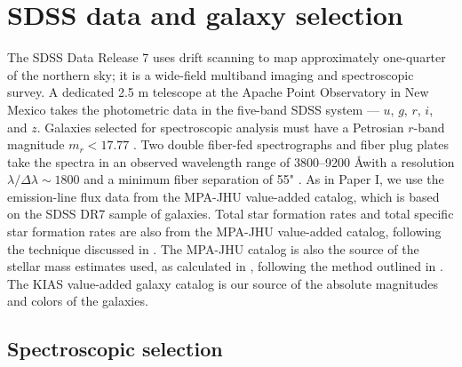 %
%
\section[SDSS Data]{SDSS data and galaxy selection}

The SDSS Data Release 7 \citep[DR7;][]{Abazajian09} uses drift scanning to map 
approximately one-quarter of the northern sky; it is a wide-field multiband 
imaging and spectroscopic survey.  A dedicated 2.5 m telescope at the Apache 
Point Observatory in New Mexico \citep{Fukugita96, Gunn98} takes the photometric 
data in the five-band SDSS system --- $u$, $g$, $r$, $i$, and $z$.  Galaxies 
selected for spectroscopic analysis must have a Petrosian $r$-band magnitude 
$m_r < 17.77$ \citep{Lupton01, Strauss02}.  Two double fiber-fed spectrographs 
and fiber plug plates take the spectra in an observed wavelength range of 
3800--9200 \AA with a resolution $\lambda / \Delta \lambda \sim 1800$ and a 
minimum fiber separation of 55" \citep{Blanton03}.  As in Paper I, we use 
the emission-line flux data from the MPA-JHU value-added catalog, which is based 
on the SDSS DR7 sample of galaxies.  Total star formation rates and total 
specific star formation rates are also from the MPA-JHU value-added catalog, 
following the technique discussed in \cite{Brinchmann04}.  The MPA-JHU catalog 
is also the source of the stellar mass estimates used, as calculated in 
\cite{Tremonti04}, following the method outlined in \cite{Kauffmann03}.  The 
KIAS value-added galaxy catalog \citep{Choi10} is our source of the absolute 
magnitudes and colors of the galaxies.


\subsection{Spectroscopic selection}\label{sec:SDSS_limits}

